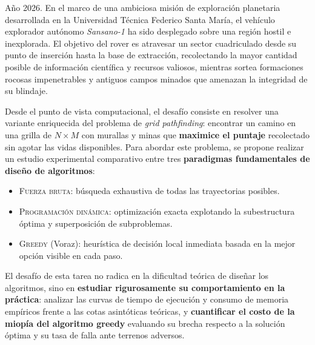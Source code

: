 
Año 2026. En el marco de una ambiciosa misión de exploración planetaria desarrollada en la Universidad Técnica Federico Santa María, el vehículo explorador autónomo \emph{Sansano-1} ha sido desplegado sobre una región hostil e inexplorada. El objetivo del rover es atravesar un sector cuadriculado desde su punto de inserción hasta la base de extracción, recolectando la mayor cantidad posible de información científica y recursos valiosos, mientras sortea formaciones rocosas impenetrables y antiguos campos minados que amenazan la integridad de su blindaje.

Desde el punto de vista computacional, el desafío consiste en resolver una variante enriquecida del problema de \emph{grid pathfinding}: encontrar un camino en una grilla de $N \times M$ con murallas y minas que \textbf{maximice el puntaje} recolectado sin agotar las vidas disponibles. Para abordar este problema, se propone realizar un estudio experimental comparativo entre tres \textbf{paradigmas fundamentales de diseño de algoritmos}:
\begin{itemize}
  \item \textsc{Fuerza bruta}: búsqueda exhaustiva de todas las trayectorias posibles.
  \item \textsc{Programación dinámica}: optimización exacta explotando la subestructura óptima y superposición de subproblemas.
  \item \textsc{Greedy} (Voraz): heurística de decisión local inmediata basada en la mejor opción visible en cada paso.
\end{itemize}

El desafío de esta tarea no radica en la dificultad teórica de diseñar los algoritmos, sino en \textbf{estudiar rigurosamente su comportamiento en la práctica}: analizar las curvas de tiempo de ejecución y consumo de memoria empíricos frente a las cotas asintóticas teóricas, y \textbf{cuantificar el costo de la miopía del algoritmo greedy} evaluando su brecha respecto a la solución óptima y su tasa de falla ante terrenos adversos.
